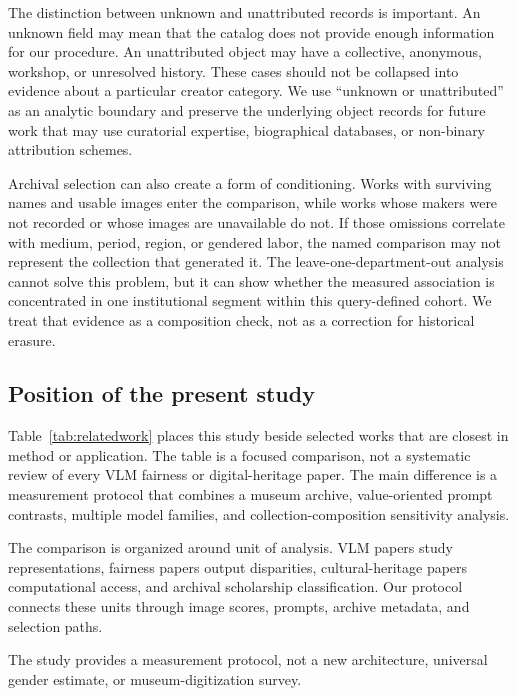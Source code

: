 \documentclass[pdflatex,sn-basic,Numbered]{sn-jnl}
\begin{document}
The distinction between unknown and unattributed records is important. An unknown field may mean that the catalog does not provide enough information for our procedure. An unattributed object may have a collective, anonymous, workshop, or unresolved history. These cases should not be collapsed into evidence about a particular creator category. We use ``unknown or unattributed'' as an analytic boundary and preserve the underlying object records for future work that may use curatorial expertise, biographical databases, or non-binary attribution schemes.

Archival selection can also create a form of conditioning. Works with surviving names and usable images enter the comparison, while works whose makers were not recorded or whose images are unavailable do not. If those omissions correlate with medium, period, region, or gendered labor, the named comparison may not represent the collection that generated it. The leave-one-department-out analysis cannot solve this problem, but it can show whether the measured association is concentrated in one institutional segment within this query-defined cohort. We treat that evidence as a composition check, not as a correction for historical erasure.

\subsection{Position of the present study}

Table~\ref{tab:relatedwork} places this study beside selected works that are closest in method or application. The table is a focused comparison, not a systematic review of every VLM fairness or digital-heritage paper. The main difference is a measurement protocol that combines a museum archive, value-oriented prompt contrasts, multiple model families, and collection-composition sensitivity analysis.

The comparison is organized around unit of analysis. VLM papers study representations, fairness papers output disparities, cultural-heritage papers computational access, and archival scholarship classification. Our protocol connects these units through image scores, prompts, archive metadata, and selection paths.

The study provides a measurement protocol, not a new architecture, universal gender estimate, or museum-digitization survey.
\end{document}
